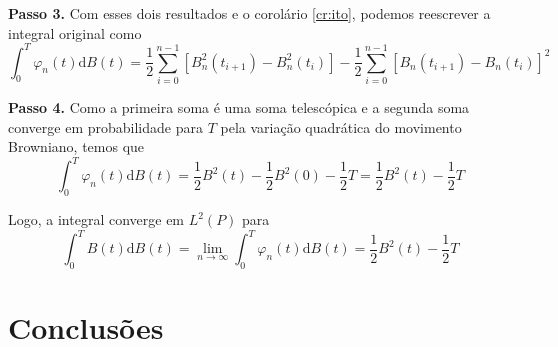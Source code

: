 \documentclass[portrait]{a0poster}	%
\theoremstyle{definition}
\begin{document}
\begin{multicols}{2}
\begin{example}
        \textbf{Passo 3.} Com esses dois resultados e o corolário \eqref{cr:ito}, podemos reescrever a integral original como
        \[
            \int_0^T \varphi_n(t) \mathrm{d}B(t) = \frac{1}{2} \sum_{i=0}^{n-1} \left[ B_n^2(t_{i+1}) - B_n^2(t_i) \right] - \frac{1}{2} \sum_{i=0}^{n-1} \left[ B_n(t_{i+1}) - B_n(t_i) \right]^2
        \]
        
        \textbf{Passo 4.} Como a primeira soma é uma soma telescópica e a segunda soma converge em probabilidade para $T$ pela variação quadrática do movimento Browniano, temos que
        \[
            \int_0^T \varphi_n(t) \mathrm{d}B(t) = \frac{1}{2} B^2(t) - \frac{1}{2} B^2(0) - \frac{1}{2}T = \frac{1}{2} B^2(t) - \frac{1}{2}T 
        \]
        
        Logo, a integral converge em $L^2(P)$ para
        \begin{equation}
            \int_0^T B(t) \mathrm{d}B(t) = \lim_{n \to \infty} \int_0^T \varphi_n(t) \mathrm{d}B(t) = \frac{1}{2} B^2(t) - \frac{1}{2}T 
        \end{equation}
    \end{example}





    \section*{Conclusões}


\end{multicols}
\end{document}
